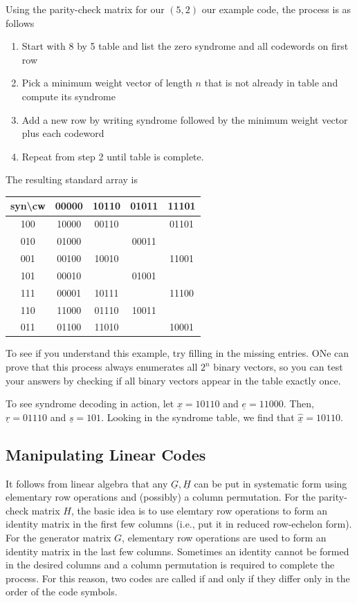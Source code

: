 Using the parity-check matrix for our $(5,2)$ our example code, the process is as follows
\begin{enumerate}
\item Start with 8 by 5 table and list the zero syndrome and all codewords on first row
\item Pick a minimum weight vector of length $n$ that is not already in table and compute its syndrome
\item Add a new row by writing syndrome followed by the minimum weight vector plus each codeword
\item Repeat from step 2 until table is complete.
\end{enumerate}
The resulting standard array is
\begin{center}
\begin{tabular}{|c||c|c|c|c|}
\hline 
syn\textbackslash cw &  00000 & 10110 & 01011 & 11101\tabularnewline
\hline
\hline 
100 & 10000 & 00110 &  & 01101\tabularnewline
\hline 
010 & 01000 &  & 00011 & \tabularnewline
\hline 
001 & 00100 & 10010 &  & 11001\tabularnewline
\hline 
101 & 00010 &  & 01001 & \tabularnewline
\hline 
111 & 00001 & 10111 &  & 11100\tabularnewline
\hline 
110 & 11000 & 01110 & 10011 & \tabularnewline
\hline 
011 & 01100 & 11010 &  & 10001\tabularnewline
\hline
\end{tabular}
\end{center}
To see if you understand this example, try filling in the missing entries.
ONe can prove that this process always enumerates all $2^{n}$ binary vectors, so you can test your answers by checking if all binary vectors appear in the table exactly once.

\begin{example}
To see syndrome decoding in action, let $\underline{x}=10110$ and $\underline{e}=11000$.
Then,$\underline{r}=01110$ and $\underline{s}=101$.
Looking in the syndrome table, we find that $\underline{\hat{x}}=10110$.
\end{example}

\subsection{Manipulating Linear Codes}

It follows from linear algebra that any $\underline{G},\underline{H}$ can be put in systematic form using elementary row operations and (possibly) a column permutation.
For the parity-check matrix $H$, the basic idea is to use elemtary row operations to form an identity matrix in the first few columns (i.e., put it in reduced row-echelon form).
For the generator matrix $G$, elementary row operations are used to form an identity matrix in the last few columns.
Sometimes an identity cannot be formed in the desired columns and a column permutation is required to complete the process.
For this reason, two codes are called  if and only if they differ only in the order of the code symbols.

